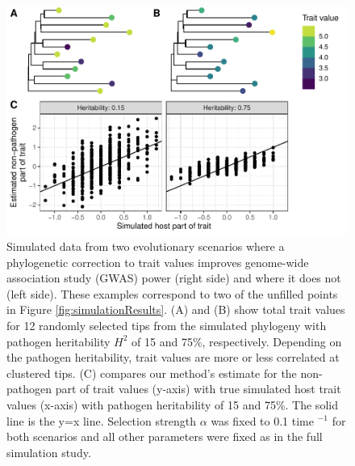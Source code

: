 \documentclass[11pt]{article}
\begin{document}
\begin{linenumbers}
\begin{figure}[H]
	\begin{center}
		\includegraphics[width=\linewidth]{figures/example_simulation_trait_values.pdf}
		\caption{Simulated data from two evolutionary scenarios where a phylogenetic correction to trait values improves genome-wide association study (GWAS) power (right side) and where it does not (left side). These examples correspond to two of the unfilled points in Figure \ref{fig:simulationResults}. (A) and (B) show total trait values for 12 randomly selected tips from the simulated phylogeny with pathogen heritability $H^2$ of 15 and 75\%, respectively. Depending on the pathogen heritability, trait values are more or less correlated at clustered tips. (C) compares our method's estimate for the non-pathogen part of trait values (y-axis) with true simulated host trait values (x-axis) with pathogen heritability of 15 and 75\%. The solid line is the y=x line. Selection strength $\alpha$ was fixed to 0.1 time $^{-1}$ for both scenarios and all other parameters were fixed as in the full simulation study.}
		\label{fig:simulationTraitExample}
	\end{center}
\end{figure}


\end{linenumbers}
\end{document}
